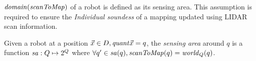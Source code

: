 $\mathit{domain}(\mathit{scanToMap})$ of a robot is defined as its sensing area. This assumption is required to ensure the \emph{Individual soundess} of a mapping updated using LIDAR scan information.






\begin{definition}
   Given a robot at a position $\Vec{x}\in D, \mathit{quant}{\Vec{x}} = q$, the \emph{sensing area} around $q$ is a function $\mathit{sa}: Q \mapsto 2^{Q}$ where $\forall q^\prime \in \mathit{sa}(q), \mathit{scanToMap}(q) = \mathit{world}_Q(q)$.
\end{definition}





